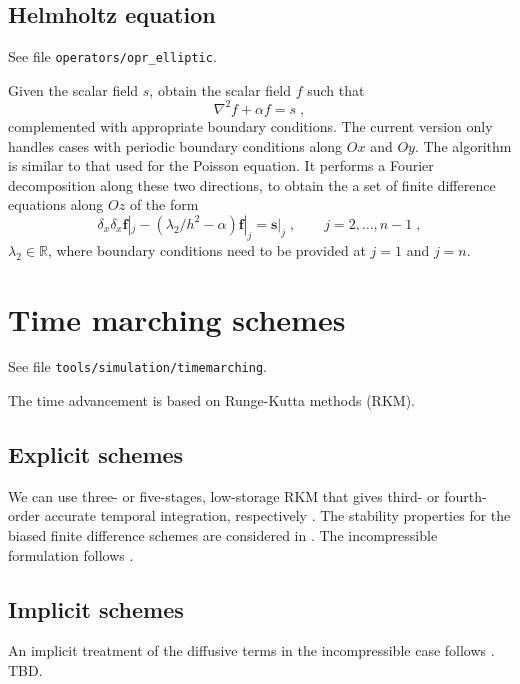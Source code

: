 \subsection{Helmholtz equation}
\label{sec:helmholtz}

See file {\tt operators/opr\_elliptic}. 

Given the scalar field $s$, obtain the scalar field $f$ such that
\begin{equation}
\nabla^2 f + \alpha f= s \;,
\end{equation}
complemented with appropriate boundary conditions. The current version only handles cases with periodic boundary conditions along $Ox$ and $Oy$. The algorithm is similar to that used for the Poisson equation. It performs a Fourier decomposition along these two directions, to obtain the a set of finite difference equations along $Oz$ of the form
\begin{equation}
  \delta_x \delta_x \mathbf{f}|_j - (\lambda_2/h^2-\alpha)\mathbf{f}|_j=\mathbf{s}|_j
  \;,\qquad j=2,\ldots,n-1 \;,
\end{equation}
$\lambda_2\in\mathbb{R}$, where boundary conditions need to be provided at $j=1$ and $j=n$.

\section{Time marching schemes}

See file {\tt tools/simulation/timemarching}. 

The time advancement is based on Runge-Kutta methods (RKM).

\subsection{Explicit schemes}

We can use three- or five-stages, low-storage RKM that gives third- or fourth-order accurate temporal integration, respectively \citep{williamson1980low,carpenter1994fourth}. The stability properties for the biased finite difference schemes are considered in \cite{carpenter1993stability}. The incompressible formulation follows \cite{williamson1980low}.

\subsection{Implicit schemes}

An implicit treatment of the diffusive terms in the incompressible case follows \cite{spalart1991spectral}. TBD.


